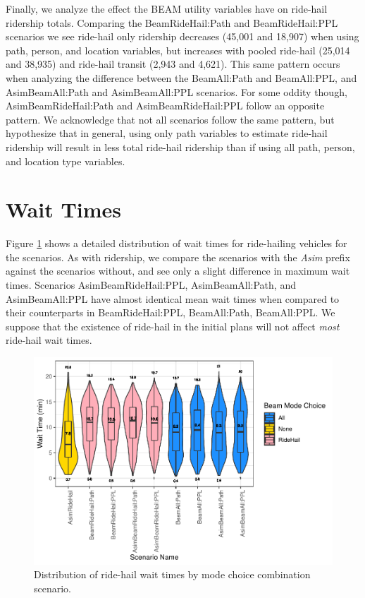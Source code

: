 \documentclass[fancy, masters]{byuthesis}
\begin{document}
Finally, we analyze the effect the BEAM utility variables have on ride-hail ridership totals. Comparing the BeamRideHail:Path and BeamRideHail:PPL scenarios we see ride-hail only ridership decreases (45,001 and 18,907) when using path, person, and location variables, but increases with pooled ride-hail (25,014 and 38,935) and ride-hail transit (2,943 and 4,621). This same pattern occurs when analyzing the difference between the BeamAll:Path and BeamAll:PPL, and AsimBeamAll:Path and AsimBeamAll:PPL scenarios. For some oddity though, AsimBeamRideHail:Path and AsimBeamRideHail:PPL follow an opposite pattern. We acknowledge that not all scenarios follow the same pattern, but hypothesize that in general, using only path variables to estimate ride-hail ridership will result in less total ride-hail ridership than if using all path, person, and location type variables.

\hypertarget{res-waits}{%
\section{Wait Times}\label{res-waits}}

Figure \ref{fig:waits} shows a detailed distribution of wait times for ride-hailing vehicles for the scenarios. As with ridership, we compare the scenarios with the \emph{Asim} prefix against the scenarios without, and see only a slight difference in maximum wait times. Scenarios AsimBeamRideHail:PPL, AsimBeamAll:Path, and AsimBeamAll:PPL have almost identical mean wait times when compared to their counterparts in BeamRideHail:PPL, BeamAll:Path, BeamAll:PPL. We suppose that the existence of ride-hail in the initial plans will not affect \emph{most} ride-hail wait times.

\begin{figure}

{\centering \includegraphics{thesis_files/figure-latex/waits-1} 

}

\caption{Distribution of ride-hail wait times by mode choice combination scenario.}\label{fig:waits}
\end{figure}
\end{document}
